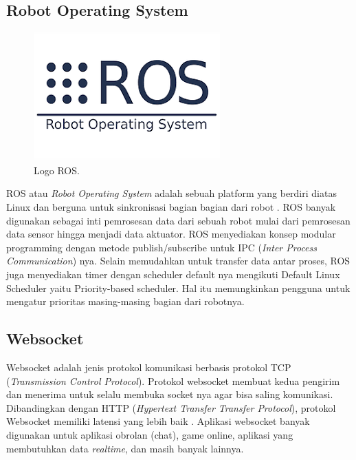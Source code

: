 \subsection{Robot Operating System}
\label{sec:ros}
\begin{figure}[H]
    \centering
  
    \includegraphics[scale=0.45]{gambar/ros.png}
  
    \caption{Logo ROS.}
    \label{fig:ros}
\end{figure}
ROS atau \emph{Robot Operating System} adalah sebuah platform yang berdiri 
diatas 
Linux dan berguna untuk sinkronisasi bagian bagian dari 
robot \Parencite{ref_ros}. ROS banyak digunakan sebagai inti 
pemrosesan data dari sebuah robot mulai dari pemrosesan data sensor 
hingga menjadi data aktuator. ROS menyediakan konsep modular programming 
dengan metode publish/subscribe untuk IPC (\emph{Inter Process Communication}) nya. Selain memudahkan untuk 
transfer data antar proses, ROS juga menyediakan timer dengan scheduler 
default nya mengikuti Default Linux Scheduler yaitu Priority-based scheduler. 
Hal itu memungkinkan pengguna untuk mengatur prioritas masing-masing bagian 
dari robotnya. 

\subsection{Websocket}
Websocket adalah jenis protokol komunikasi berbasis protokol TCP (\emph{Transmission Control Protocol}). 
Protokol websocket membuat kedua pengirim dan menerima untuk selalu 
membuka socket nya agar bisa saling komunikasi. 
Dibandingkan dengan HTTP (\emph{Hypertext Transfer Transfer Protocol}), 
protokol Websocket memiliki 
latensi yang lebih baik \Parencite{ref_websocket}. Aplikasi 
websocket banyak digunakan untuk aplikasi obrolan (chat), game online,
 aplikasi yang membutuhkan data \emph{realtime}, dan masih banyak lainnya. 
